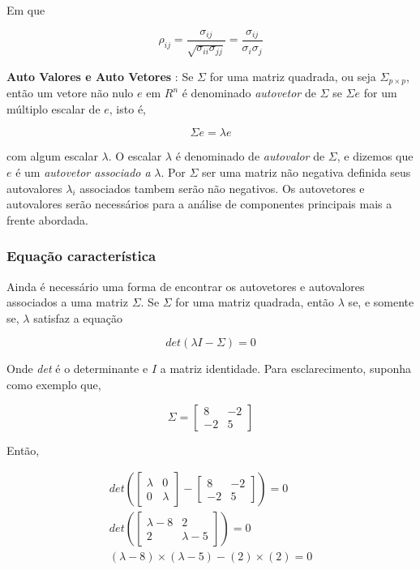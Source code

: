 \documentclass[
  letterpaper,
  DIV=11,
  numbers=noendperiod]{scrreprt}
\begin{document}
Em que

\[
\rho_{ij} = \frac{\sigma_{ij}}{\sqrt{\sigma_{ii}\sigma_{jj}}} = \frac{\sigma_{ij}}{\sigma_i\sigma_j}
\]

\textbf{Auto Valores e Auto Vetores} : Se \(\Sigma\) for uma matriz
quadrada, ou seja \(\Sigma_{p\times p}\), então um vetore não nulo \(e\)
em \(R^n\) é denominado \emph{autovetor} de \(\Sigma\) se \(\Sigma e\)
for um múltiplo escalar de \(e\), isto é,

\[
\Sigma e = \lambda e
\]

com algum escalar \(\lambda\). O escalar \(\lambda\) é denominado de
\emph{autovalor} de \(\Sigma\), e dizemos que \(e\) é um \emph{autovetor
associado a} \(\lambda\). Por \(\Sigma\) ser uma matriz não negativa
definida seus autovalores \(\lambda_i\) associados tambem serão não
negativos. Os autovetores e autovalores serão necessários para a análise
de componentes principais mais a frente abordada.

\hypertarget{equauxe7uxe3o-caracteruxedstica}{%
\subsubsection{Equação
característica}\label{equauxe7uxe3o-caracteruxedstica}}

Ainda é necessário uma forma de encontrar os autovetores e autovalores
associados a uma matriz \(\Sigma\). Se \(\Sigma\) for uma matriz
quadrada, então \(\lambda\) se, e somente se, \(\lambda\) satisfaz a
equação

\[
det(\lambda I - \Sigma) = 0
\]

Onde \emph{det} é o determinante e \(I\) a matriz identidade. Para
esclarecimento, suponha como exemplo que,

\[
\Sigma = \begin{bmatrix}
8 & -2 \\
-2 & 5
\end{bmatrix}
\]

Então,

\[
\begin{split}
det\left(\begin{bmatrix}
\lambda& 0\\
0 & \lambda
\end{bmatrix}
-  
\begin{bmatrix}
8 & -2 \\
-2 & 5
\end{bmatrix}
\right) = 0\\
det\left(\begin{bmatrix}
\lambda - 8 & 2 \\
2 & \lambda-5
\end{bmatrix}
\right) = 0 \\
(\lambda - 8)\times(\lambda-5) - (2)\times(2) = 0
\end{split}
\]
\end{document}
